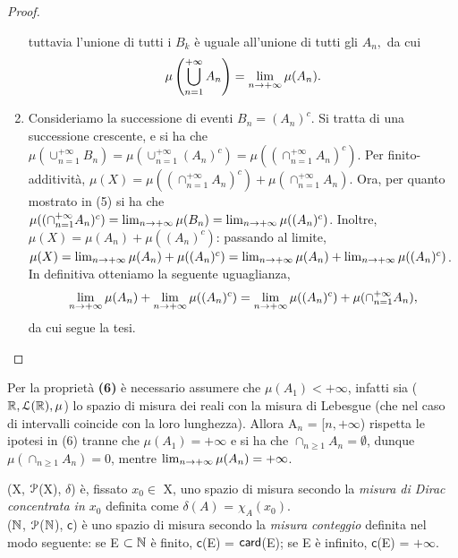 \documentclass[Completo.tex]{subfiles}
\begin{document}
\begin{proof}
\begin{enumerate}
		tuttavia l'unione di tutti i $B_k$ è uguale all'unione di tutti gli $A_n,$ da cui
		\begin{equation*}
		\mu\left(\bigcup_{n =1}^{+\infty} A_n\right) = \lim_{n \rightarrow +\infty} \mu(A_n).
		\end{equation*}
		\item Consideriamo la successione di eventi $B_n = (A_n)^{c}$. Si tratta di una successione crescente, e si ha che $\mu(\cup_{n=1}^{+\infty} B_n) = \mu(\cup_{n=1}^{+\infty} (A_n)^{c}) = \mu((\cap_{n=1}^{+\infty} A_n)^{c})$. Per finito-additività, $\mu(X) = \mu((\cap_{n=1}^{+\infty} A_n)^{c}) + \mu(\cap_{n=1}^{+\infty} A_n)$. Ora, per quanto mostrato in (5) si ha che $\mu((\cap_{n=1}^{+\infty} A_n)^{c}) = \lim_{n \rightarrow +\infty} \mu(B_n) = \lim_{n \rightarrow +\infty} \mu((A_n)^{c})$. Inoltre, $\mu(X) = \mu(A_n) + \mu((A_n)^{c})$: passando al limite, $\mu(X) = \lim_{n \rightarrow +\infty} \mu(A_n) + \mu((A_n)^{c}) = \lim_{n \rightarrow +\infty} \mu(A_n) + \lim_{n \rightarrow +\infty} \mu((A_n)^{c})$. In definitiva otteniamo la seguente uguaglianza,
		\begin{equation*}
		\lim_{n \rightarrow +\infty} \mu(A_n) + \lim_{n \rightarrow +\infty} \mu((A_n)^{c}) = \lim_{n \rightarrow +\infty} \mu((A_n)^{c}) + \mu(\cap_{n=1}^{+\infty} A_n),
		\end{equation*}
		da cui segue la tesi.
	\end{enumerate}
\end{proof}
\begin{Oss}
	Per la proprietà \textbf{(6)} è necessario assumere che $\mu(A_1) < +\infty$, infatti sia ($\bb[R], \eu[L](\bb[R]), \mu$) lo spazio di misura dei reali con la misura di Lebesgue (che nel caso di intervalli coincide con la loro lunghezza). Allora A$_n$ = [$n, +\infty$) rispetta le ipotesi in (6) tranne che $\mu(A_1) = +\infty$ e si ha che $\cap_{n\geq1}A_n = \emptyset$, dunque $\mu(\cap_{n\geq1}A_n) = 0$, mentre $\lim_{n \rightarrow +\infty} \mu(A_n) = +\infty$.
\end{Oss}
\begin{Ex}
	(X, $\eu[P]$(X), $\delta$) è, fissato $x_0 \in$ X, uno spazio di misura secondo la \textit{misura di Dirac concentrata in $x_0$} definita come $\delta(A)$ = $\chi_A(x_0)$. \\
	($\bb[N]$, $\eu[P]$($\bb[N]$), $\mathsf{c}$) è uno spazio di misura secondo la \textit{misura conteggio} definita nel modo seguente: se E $\sset \bb[N]$ è finito, $\mathsf{c}$(E) = $\sf[card]$(E); se E è infinito, $\mathsf{c}$(E) = $+\infty$.
\end{Ex}
\end{document}
